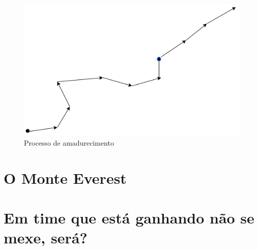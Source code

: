 \begin{figure}[H]
    \centering
    \includegraphics[scale=0.37,keepaspectratio=true]{images/01.png}
    \caption{Processo de amadurecimento}
    \label{mature_process}
\end{figure}

\section{O Monte Everest}

\section{Em time que está ganhando não se mexe, será?}
